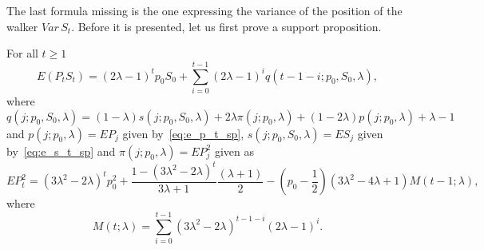 \documentclass[runningheads]{CMSIM}
\begin{document}
    The last formula missing is the one expressing the variance of the
    position of the walker $Var\,S_{t}$.
    Before it is presented, let
    us first prove a support proposition.
    \begin{proposition}
        For all $t\ge1$
        \begin{equation}
            E(P_{t}S_{t})=(2\lambda-1)^{t}p_{0}S_{0}+\sum_{i=0}^{t-1}(2\lambda-1)^{i}q(t-1-i;p_{0},S_{0},\lambda),\label{eq:e_p_s_t_sp}
        \end{equation}
        where
        \[
            q(j;p_{0},S_{0},\lambda)=(1-\lambda)s(j;p_{0},S_{0},\lambda)+2\lambda\pi(j;p_{0},\lambda)+(1-2\lambda)p(j;p_{0},\lambda)+\lambda-1
        \]
        and $p(j;p_{0},\lambda)=EP_{j}$ given by~\eqref{eq:e_p_t_sp}, $s(j;p_{0},S_{0},\lambda)=ES_{j}$
        given by~\eqref{eq:e_s_t_sp} and $\pi(j;p_{0},\lambda)=EP_{j}^{2}$
        given as
        \begin{equation}
            EP_{t}^{2}=(3\lambda^{2}-2\lambda)^{t}p_{0}^{2}+\frac{1-(3\lambda^{2}-2\lambda)^{t}}{3\lambda+1}\frac{(\lambda+1)}{2}-(p_{0}-\frac{1}{2})(3\lambda^2 - 4\lambda +1)M(t-1;\lambda),\label{eq:e_p2_t_sp}
        \end{equation}
        where
        \[
            M(t;\lambda)=\sum_{i=0}^{t-1}(3\lambda^{2}-2\lambda)^{t-1-i}(2\lambda-1)^{i}.
        \]
    \end{proposition}
\end{document}
